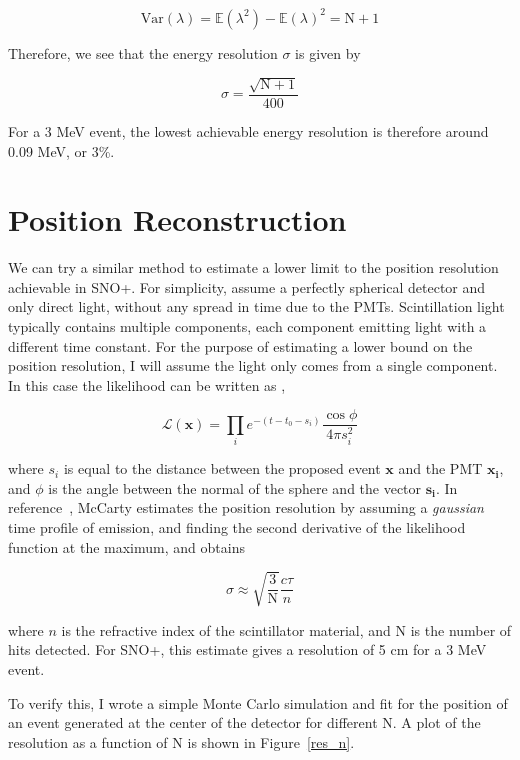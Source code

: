 \documentclass{article}
\newcommand{\like}{\mathscr{L}}
\newcommand{\N}{\mathrm{N}}
\begin{document}
\[
    \mathrm{Var}(\lambda) = \mathbb{E}(\lambda^2) - \mathbb{E}(\lambda)^2 = \N + 1
\]

Therefore, we see that the energy resolution $\sigma$ is given by

\[
    \sigma = \frac{\sqrt{\N+1}}{400}
\]

For a 3 MeV event, the lowest achievable energy resolution is therefore around
0.09 MeV, or 3\%.

\section{Position Reconstruction}

We can try a similar method to estimate a lower limit to the position
resolution achievable in SNO+. For simplicity, assume a perfectly spherical
detector and only direct light, without any spread in time due to the PMTs.
Scintillation light typically contains multiple components, each component
emitting light with a different time constant. For the purpose of estimating a
lower bound on the position resolution, I will assume the light only comes from
a single component. In this case the likelihood can be written as
\cite{mccarty},

\[
    \like(\mathbf{x}) = \prod_i e^{-(t - t_0 - s_i)}
    \frac{\cos{\phi}}{4 \pi s_i^2}
\]

where $s_i$ is equal to the distance between the proposed event $\mathbf{x}$ and
the PMT $\mathbf{x_i}$, and $\phi$ is the angle between the normal of the
sphere and the vector $\mathbf{s_i}$. In reference~\cite{mccarty}, McCarty
estimates the position resolution by assuming a \emph{gaussian} time profile of
emission, and finding the second derivative of the likelihood function at the
maximum, and obtains

\begin{equation}
    \sigma \approx \sqrt{\frac{3}{\N}} \frac{c \tau}{n}
    \label{gauss_sigma}
\end{equation}

where $n$ is the refractive index of the scintillator material, and $\N$ is the
number of hits detected. For SNO+, this estimate gives a resolution of 5 cm for
a 3 MeV event.

To verify this, I wrote a simple Monte Carlo simulation and fit for the
position of an event generated at the center of the detector for different $\N$.
A plot of the resolution as a function of $\N$ is shown in Figure~\ref{res_n}.
\end{document}
